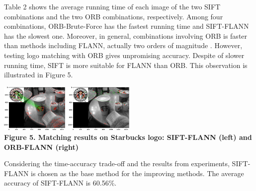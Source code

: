 \documentclass[letterpaper, 10 pt, conference]{ieeeconf}  %
\begin{document}
\par
Table 2 shows the average running time of each image of the two SIFT combinations and the two ORB combinations, respectively. Among four combinations, ORB-Brute-Force has the fastest running time and SIFT-FLANN has the slowest one. Moreover, in general, combinations involving ORB is faster than methods including FLANN, actually two orders of magnitude \cite{orb}. However, testing logo matching with ORB gives unpromising accuracy. Despite of slower running time, SIFT is more suitable for FLANN than ORB. This observation is illustrated in Figure 5.\par
\begin{center}
\includegraphics[width=0.5\textwidth]{sosanh.pdf} \\
\textbf{Figure 5. Matching results on Starbucks logo: SIFT-FLANN (left) and ORB-FLANN (right)}
\end{center}
\par
Considering the time-accuracy trade-off and the results from experiments, SIFT-FLANN is chosen as the base method for the improving methods. The average accuracy of SIFT-FLANN is 60.56\%.\par
\end{document}
